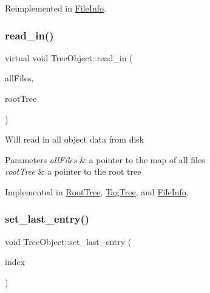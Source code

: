 Reimplemented in \mbox{\hyperlink{classFileInfo_a278136b1d68f55dc56a4be807076fc0d}{File\+Info}}.

\mbox{\label{classTreeObject_a722eb00e6782626281afc8eff92840a4}} 
\subsubsection{\texorpdfstring{read\+\_\+in()}{read\_in()}}
{\footnotesize\ttfamily virtual void Tree\+Object\+::read\+\_\+in (\begin{DoxyParamCaption}\item[{unordered\+\_\+multimap$<$ string, \mbox{\hyperlink{classFileInfo}{File\+Info}} $\ast$$>$ $\ast$}]{all\+Files,  }\item[{\mbox{\hyperlink{classRootTree}{Root\+Tree}} $\ast$}]{root\+Tree }\end{DoxyParamCaption})\hspace{0.3cm}{\ttfamily [pure virtual]}}

Will read in all object data from disk 
\begin{DoxyParams}{Parameters}
{\em all\+Files} & a pointer to the map of all files \\
\hline
{\em root\+Tree} & a pointer to the root tree \\
\hline
\end{DoxyParams}


Implemented in \mbox{\hyperlink{classRootTree_a658eed78be67e890de2283af960dc532}{Root\+Tree}}, \mbox{\hyperlink{classTagTree_af86ee6713fa03c3909e04608512b8b62}{Tag\+Tree}}, and \mbox{\hyperlink{classFileInfo_a2bf60d4be97347f3d7a15cf839afca7d}{File\+Info}}.

\mbox{\label{classTreeObject_a2ec94bc9d2647275049ddf2a70b8510e}} 
\subsubsection{\texorpdfstring{set\+\_\+last\+\_\+entry()}{set\_last\_entry()}}
{\footnotesize\ttfamily void Tree\+Object\+::set\+\_\+last\+\_\+entry (\begin{DoxyParamCaption}\item[{\mbox{\hyperlink{structindex}{Index}}}]{index }\end{DoxyParamCaption})}

